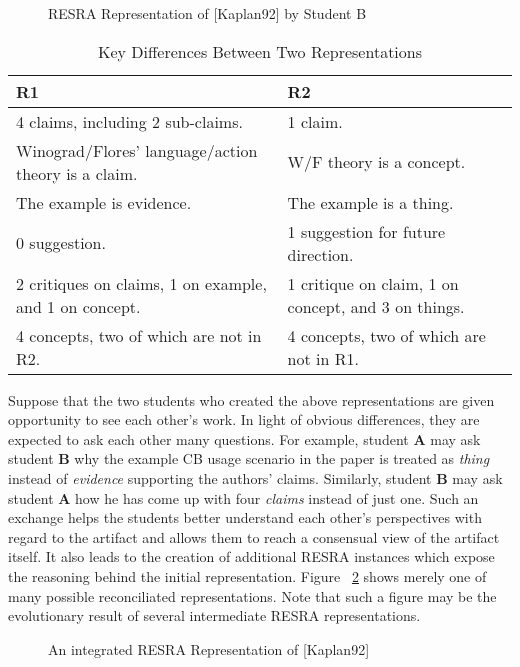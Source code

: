 \begin{figure}[htb]
  \caption{RESRA Representation of [Kaplan92] by Student B}
  \label{fig:cb2}
\end{figure}

\begin{table}[ht]
  \begin{center}
    \begin{tabular} {|p{2.75in}|p{2.75in}|} \hline   
      {\bf R1 } & {\bf R2}\\ \hline 4 claims, including 2 sub-claims. & 1
claim. \\ \hline
      
      Winograd/Flores' language/action theory is a claim. & W/F theory is a
concept. \\ \hline
      
      The example is evidence. & The example is a thing. \\ \hline
      
      0 suggestion. & 1 suggestion for future direction. \\ \hline
      
      2 critiques on claims, 1 on example, and 1 on concept. & 1 critique
on claim, 1 on concept, and 3 on things. \\ \hline
      
      4 concepts, two of which are not in R2. & 4 concepts, two of which
are not in R1. \\ \hline
    \end{tabular}
    \caption{Key Differences Between Two Representations}
    \label{tab:difference}
  \end{center}
\end{table}

Suppose that the two students who created the above representations are
given opportunity to see each other's work. In light of obvious
differences, they are expected to ask each other many questions. For
example, student {\bf A} may ask student {\bf B} why the example CB usage
scenario in the paper is treated as {\it thing\/} instead of {\it
evidence\/} supporting the authors' claims. Similarly, student {\bf B} may
ask student {\bf A} how he has come up with four {\it claims\/} instead of
just one. Such an exchange helps the students better understand
each other's perspectives with regard to the artifact and allows them to
reach a consensual view of the artifact itself. It also leads to the
creation of additional RESRA instances which expose the reasoning behind
the initial representation. Figure ~\ref{fig:cbx} shows merely one of many
possible reconciliated representations. Note that such a figure may be the
evolutionary result of several intermediate RESRA representations.

\begin{figure}[htb]
  \caption{An integrated RESRA Representation of [Kaplan92]}
  \label{fig:cbx}
\end{figure}


